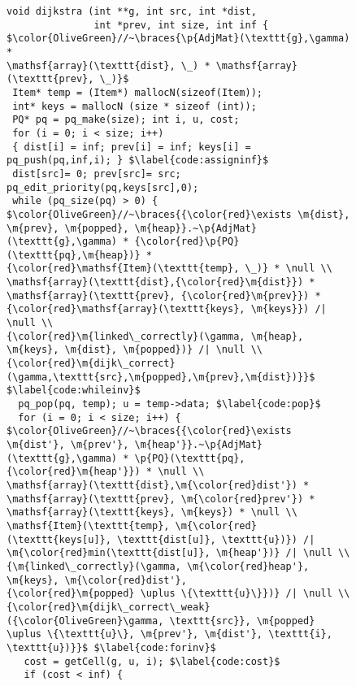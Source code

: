 
\begin{figure}[t]

\begin{lstlisting}[mathescape=true,showlines=true]
void dijkstra (int **g, int src, int *dist,
               int *prev, int size, int inf {
$\color{OliveGreen}//~\braces{\p{AdjMat}(\texttt{g},\gamma) *
\mathsf{array}(\texttt{dist}, \_) * \mathsf{array}(\texttt{prev}, \_)}$
 Item* temp = (Item*) mallocN(sizeof(Item));
 int* keys = mallocN (size * sizeof (int));
 PQ* pq = pq_make(size); int i, u, cost;
 for (i = 0; i < size; i++)
 { dist[i] = inf; prev[i] = inf; keys[i] = pq_push(pq,inf,i); } $\label{code:assigninf}$
 dist[src]= 0; prev[src]= src; pq_edit_priority(pq,keys[src],0);
 while (pq_size(pq) > 0) {
$\color{OliveGreen}//~\braces{{\color{red}\exists \m{dist}, \m{prev}, \m{popped}, \m{heap}}.~\p{AdjMat}(\texttt{g},\gamma) * {\color{red}\p{PQ}(\texttt{pq},\m{heap})} *
{\color{red}\mathsf{Item}(\texttt{temp}, \_)} * \null \\
\mathsf{array}(\texttt{dist},{\color{red}\m{dist}}) *
\mathsf{array}(\texttt{prev}, {\color{red}\m{prev}}) *
{\color{red}\mathsf{array}(\texttt{keys}, \m{keys}}) /| \null \\
{\color{red}\m{linked\_correctly}(\gamma, \m{heap}, \m{keys}, \m{dist}, \m{popped})} /| \null \\
{\color{red}\m{dijk\_correct}(\gamma,\texttt{src},\m{popped},\m{prev},\m{dist})}}$ $\label{code:whileinv}$
  pq_pop(pq, temp); u = temp->data; $\label{code:pop}$
  for (i = 0; i < size; i++) {
$\color{OliveGreen}//~\braces{{\color{red}\exists \m{dist'}, \m{prev'}, \m{heap'}}.~\p{AdjMat}(\texttt{g},\gamma) * \p{PQ}(\texttt{pq},{\color{red}\m{heap'}}) * \null \\
\mathsf{array}(\texttt{dist},\m{\color{red}dist'}) *
\mathsf{array}(\texttt{prev}, \m{\color{red}prev'}) *
\mathsf{array}(\texttt{keys}, \m{keys}) * \null \\
\mathsf{Item}(\texttt{temp}, \m{\color{red}(\texttt{keys[u]}, \texttt{dist[u]}, \texttt{u})}) /|
\m{\color{red}min(\texttt{dist[u]}, \m{heap'})} /| \null \\
{\m{linked\_correctly}(\gamma, \m{\color{red}heap'}, \m{keys}, \m{\color{red}dist'},
{\color{red}\m{popped} \uplus \{\texttt{u}\}})} /| \null \\
{\color{red}\m{dijk\_correct\_weak}({\color{OliveGreen}\gamma, \texttt{src}}, \m{popped} \uplus \{\texttt{u}\}, \m{prev'}, \m{dist'}, \texttt{i}, \texttt{u})}}$ $\label{code:forinv}$
   cost = getCell(g, u, i); $\label{code:cost}$
   if (cost < inf) {

\end{lstlisting}
\end{figure}

